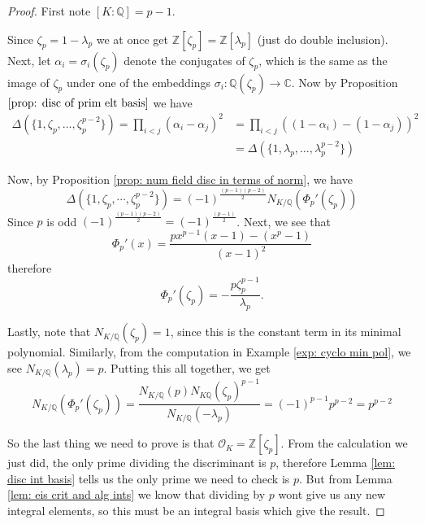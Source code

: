 \documentclass[11pt,a4paper]{report}
\theoremstyle{plain}
\theoremstyle{definition}
\theoremstyle{definition}
\newcommand{\ZZ}{\mathbb{Z}}
\def\CC{\mathbb{C}}
\def\QQ{\mathbb{Q}}
\def \a{\alpha}
\def \lam {\lambda}
\def \OO {\mathcal{O}}
\begin{document}
	\begin{proof}
		First note $[K:\QQ]=p-1$.
		
		Since $\zeta_p=1-\lam_p$ we at once get $\ZZ[\zeta_p]=\ZZ[\lam_p]$ (just do double inclusion). Next, let $\a_i=\sigma_i(\zeta_p)$ denote the conjugates of $\zeta_p$, which is the same as the image of $\zeta_p$ under one of the embeddings $\sigma_i: \QQ(\zeta_p) \to \CC$. Now  by Proposition $\ref{prop: disc of prim elt basis}$ we have \begin{align*}\Delta(\{1,\zeta_p,\dots,\zeta_p^{p-2}\})=\prod_{i < j}  (\a_i-\a_j)^2 &=\prod_{i < j}  ((1-\a_i)-(1-\a_j))^2\\&=\Delta(\{1,\lam_p,\dots,\lam_p^{p-2}\})\end{align*}
		
		Now, by Proposition \ref{prop: num field disc in terms of norm}, we have \[\Delta(\{1,\zeta_p,\cdots,\zeta_p^{p-2}\})=(-1)^{\frac{(p-1)(p-2)}{2}}N_{K/\QQ}(\Phi_p'(\zeta_p)  )\]
		Since $p$ is odd $(-1)^{\frac{(p-1)(p-2)}{2}}=(-1)^{\frac{(p-1)}{2}}$. Next, we see that \[\Phi_p'(x)=\frac{px^{p-1}(x-1)-(x^p-1)}{(x-1)^2}\] therefore \[\Phi_p'(\zeta_p)=-\frac{p\zeta_p^{p-1}}{\lam_p}.\]
		
		Lastly, note that $N_{K/\QQ}(\zeta_p)=1$, since this is the constant term in its minimal polynomial. Similarly, from the computation in Example \ref{exp: cyclo min pol}, we see $N_{K/\QQ}(\lam_p)=p$. Putting this all together, we get \[N_{K/\QQ}(\Phi_p'(\zeta_p)  )=\frac{N_{K/\QQ}(p)N_{K\QQ}(\zeta_p)^{p-1}}{N_{K/\QQ}(-\lam_p)}=(-1)^{p-1}p^{p-2}=p^{p-2}\]
		
		So the last thing we need to prove is that $\OO_K=\ZZ[\zeta_p]$. From the calculation we just did, the only prime dividing the discriminant is $p$, therefore Lemma \ref{lem: disc int basis} tells us the only prime we need to check is $p$. But from Lemma \ref{lem: eis crit and alg ints} we know that dividing by $p$ wont give us any new integral elements, so this must be an integral basis which give the result.
		
		
		
	\end{proof}
	
\end{document}
